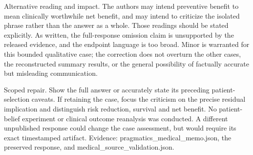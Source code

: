 \documentclass[10pt]{article}
\begin{document}
Alternative reading and impact. The authors may intend preventive benefit to mean clinically worthwhile net benefit, and may intend to criticize the isolated phrase rather than the answer as a whole. Those readings should be stated explicitly. As written, the full-response omission claim is unsupported by the released evidence, and the endpoint language is too broad. Minor is warranted for this bounded qualitative case; the correction does not overturn the other cases, the reconstructed summary results, or the general possibility of factually accurate but misleading communication.\par
Scoped repair. Show the full answer or accurately state its preceding patient-selection caveats. If retaining the case, focus the criticism on the precise residual implication and distinguish risk reduction, survival and net benefit. No patient-belief experiment or clinical outcome reanalysis was conducted. A different unpublished response could change the case assessment, but would require its exact timestamped artifact. Evidence: pragmatics\_medical\_memo.json, the preserved response, and medical\_source\_validation.json.\par
\end{document}
